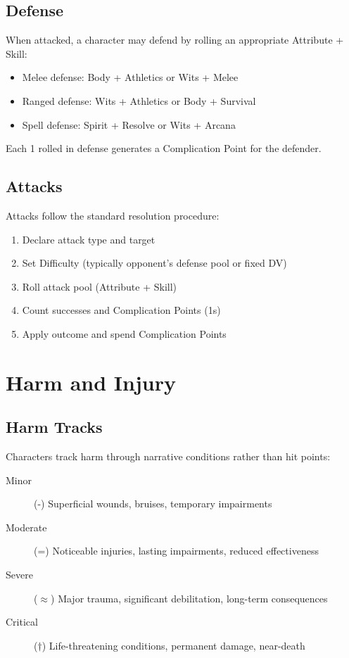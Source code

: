 \subsection{Defense}

When attacked, a character may defend by rolling an appropriate Attribute + Skill:
\begin{itemize}
\item Melee defense: Body + Athletics or Wits + Melee
\item Ranged defense: Wits + Athletics or Body + Survival
\item Spell defense: Spirit + Resolve or Wits + Arcana
\end{itemize}

Each 1 rolled in defense generates a Complication Point for the defender.

\subsection{Attacks}

Attacks follow the standard resolution procedure:
\begin{enumerate}
\item Declare attack type and target
\item Set Difficulty (typically opponent's defense pool or fixed DV)
\item Roll attack pool (Attribute + Skill)
\item Count successes and Complication Points (1s)
\item Apply outcome and spend Complication Points
\end{enumerate}

\section{Harm and Injury}

\subsection{Harm Tracks}

Characters track harm through narrative conditions rather than hit points:

\begin{description}
\item[Minor] (-) Superficial wounds, bruises, temporary impairments
\item[Moderate] (=) Noticeable injuries, lasting impairments, reduced effectiveness
\item[Severe] ($\approx$) Major trauma, significant debilitation, long-term consequences
\item[Critical] ($\dagger$) Life-threatening conditions, permanent damage, near-death
\end{description}

